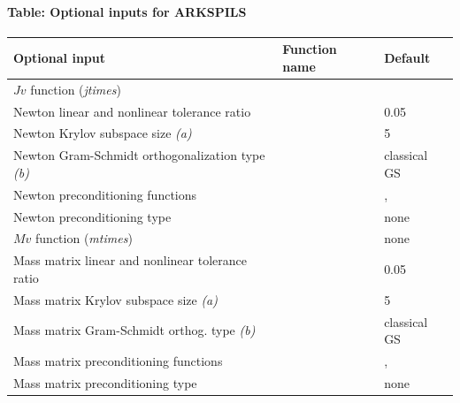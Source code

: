 \documentclass[letterpaper,10pt,english]{sphinxmanual}
\begin{document}
\paragraph{Table: Optional inputs for ARKSPILS}
\label{c_interface/User_callable:cinterface-arkspilsinputtable}\label{c_interface/User_callable:table-optional-inputs-for-arkspils}
\begin{tabulary}{\linewidth}{|L|L|L|}
\hline
\textsf{\relax 
Optional input
} & \textsf{\relax 
Function name
} & \textsf{\relax 
Default
}\\
\hline
\(Jv\) function (\emph{jtimes})
 & 
{\hyperref[c_interface/User_callable:c.ARKSpilsSetJacTimesVecFn]{\emph{}}}
 & 
\\
\hline
Newton linear and nonlinear tolerance ratio
 & 
{\hyperref[c_interface/User_callable:c.ARKSpilsSetEpsLin]{\emph{}}}
 & 
0.05
\\
\hline
Newton Krylov subspace size \emph{(a)}
 & 
{\hyperref[c_interface/User_callable:c.ARKSpilsSetMaxl]{\emph{}}}
 & 
5
\\
\hline
Newton Gram-Schmidt orthogonalization type \emph{(b)}
 & 
{\hyperref[c_interface/User_callable:c.ARKSpilsSetGSType]{\emph{}}}
 & 
classical GS
\\
\hline
Newton preconditioning functions
 & 
{\hyperref[c_interface/User_callable:c.ARKSpilsSetPreconditioner]{\emph{}}}
 & 
, 
\\
\hline
Newton preconditioning type
 & 
{\hyperref[c_interface/User_callable:c.ARKSpilsSetPrecType]{\emph{}}}
 & 
none
\\
\hline
\(Mv\) function (\emph{mtimes})
 & 
{\hyperref[c_interface/User_callable:c.ARKSpilsSetMassTimesVecFn]{\emph{}}}
 & 
none
\\
\hline
Mass matrix linear and nonlinear tolerance ratio
 & 
{\hyperref[c_interface/User_callable:c.ARKSpilsSetMassEpsLin]{\emph{}}}
 & 
0.05
\\
\hline
Mass matrix Krylov subspace size \emph{(a)}
 & 
{\hyperref[c_interface/User_callable:c.ARKSpilsSetMassMaxl]{\emph{}}}
 & 
5
\\
\hline
Mass matrix Gram-Schmidt orthog. type \emph{(b)}
 & 
{\hyperref[c_interface/User_callable:c.ARKSpilsSetMassGSType]{\emph{}}}
 & 
classical GS
\\
\hline
Mass matrix preconditioning functions
 & 
{\hyperref[c_interface/User_callable:c.ARKSpilsSetMassPreconditioner]{\emph{}}}
 & 
, 
\\
\hline
Mass matrix preconditioning type
 & 
{\hyperref[c_interface/User_callable:c.ARKSpilsSetMassPrecType]{\emph{}}}
 & 
none
\\
\hline\end{tabulary}
\end{document}
